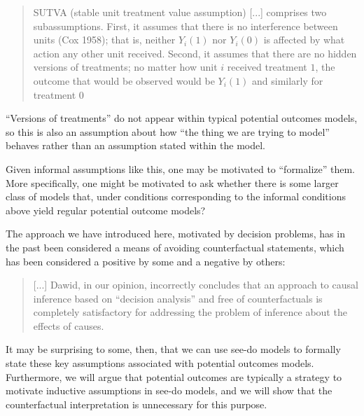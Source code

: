 \begin{quote}
SUTVA (stable unit treatment value assumption) [...] comprises two subassumptions. First, it assumes that there is no interference between units (Cox 1958); that is, neither $Y_i(1)$ nor $Y_i(0)$ is affected by what action any other unit received. Second, it assumes that there are no hidden versions of treatments; no matter how unit $i$ received treatment $1$, the outcome that would be observed would be $Y_i(1)$ and similarly for treatment $0$
\end{quote}

``Versions of treatments'' do not appear within typical potential outcomes models, so this is also an assumption about how ``the thing we are trying to model'' behaves rather than an assumption stated within the model.

Given informal assumptions like this, one may be motivated to ``formalize'' them. More specifically, one might be motivated to ask whether there is some larger class of models that, under conditions corresponding to the informal conditions above yield regular potential outcome models?


The approach we have introduced here, motivated by decision problems, has in the past been considered a means of avoiding counterfactual statements, which has been considered a positive by some \citep{dawid_causal_2000} and a negative by others:

\begin{quote}
[...] Dawid, in our opinion, incorrectly concludes that an approach to causal inference based on ``decision analysis'' and free of counterfactuals is completely satisfactory for addressing the problem of inference about the effects of causes.\citep{robins_causal_2000}
\end{quote}

It may be surprising to some, then, that we can use see-do models to formally state these key assumptions associated with potential outcomes models. Furthermore, we will argue that potential outcomes are typically a strategy to motivate inductive assumptions in see-do models, and we will show that the counterfactual interpretation is unnecessary for this purpose.

